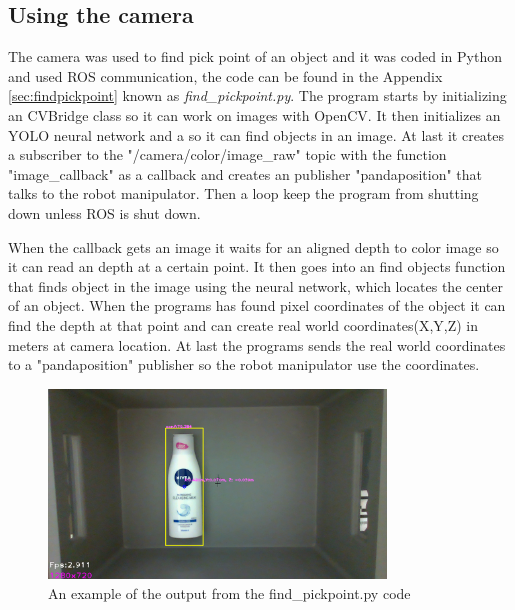 

\subsection{Using the camera}\label{camera}
The camera was used to find pick point of an object and it was coded in Python and used ROS communication, the code can be found in the Appendix \ref{sec:findpickpoint} known as \textit{find\_pickpoint.py}. 
The program starts by initializing an CVBridge class so it can work on images with OpenCV. It then initializes an YOLO neural network and a so it can find objects in an image. At last it creates a subscriber to the "/camera/color/image\_raw" topic with the function "image\_callback" as a callback and creates an publisher "pandaposition" that talks to the robot manipulator. Then a loop keep the program from shutting down unless ROS is shut down.

When the callback gets an image it waits for an aligned depth to color image so it can read an depth at a certain point. It then goes into an find objects function that finds object in the image using the neural network, which locates the center of an object. When the programs has found pixel coordinates of the object it can find the depth at that point and can create real world coordinates(X,Y,Z) in meters at camera location. At last the programs sends the real world coordinates to a "pandaposition" publisher so the robot manipulator use the coordinates.

\begin{figure}[h]
    \centering
    \includegraphics[width=0.8\textwidth]{graphics/findpickpoint.png}
    \caption{An example of the output from the find\_pickpoint.py code}
    \label{fig:findpickpoint}
\end{figure}

